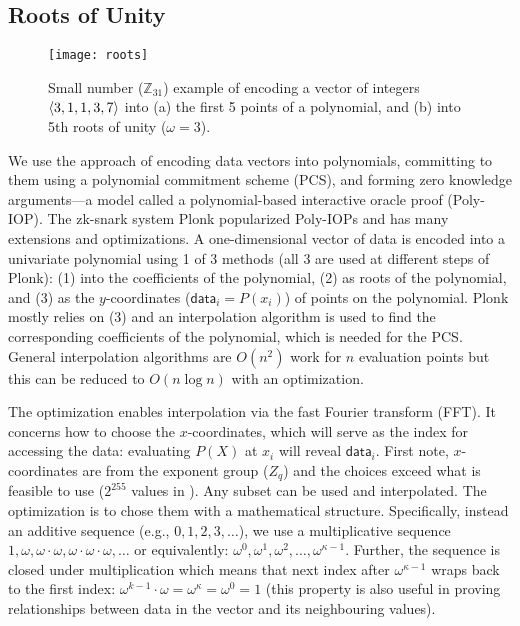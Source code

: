 \subsection{Roots of Unity}
\label{app:rou}

\begin{figure}
\centering
\texttt{[image: roots]}
\caption{Small number ($\mathbb{Z}_{31}$) example of encoding a vector of integers $\left \langle 3,1,1,3,7 \right \rangle$ into (a) the first 5 points of a polynomial, and (b) into 5th roots of unity ($\omega=3$).\label{fig:rou}}
\end{figure}

We use the approach of encoding data vectors into polynomials, committing to them using a polynomial commitment scheme (PCS), and forming zero knowledge arguments---a model called a polynomial-based interactive oracle proof (Poly-IOP). The zk-snark system Plonk popularized Poly-IOPs and has many extensions and optimizations. A one-dimensional vector of data is encoded into a univariate polynomial using 1 of 3 methods (all 3 are used at different steps of Plonk): (1) into the coefficients of the polynomial, (2) as roots of the polynomial, and (3) as the \(y\)-coordinates (\(\mathsf{data}_i=P(x_i)\)) of points on the polynomial. Plonk mostly relies on (3) and an interpolation algorithm is used to find the corresponding coefficients of the polynomial, which is
needed for the PCS. General interpolation algorithms are \(O(n^2)\) work for \(n\) evaluation points but this can be reduced to \(O(n\log n)\) with an optimization.

The optimization enables interpolation via the fast Fourier transform (FFT). It concerns how to choose the \(x\)-coordinates, which will serve as the index for accessing the data: evaluating \(P(X)\) at \(x_i\) will reveal \(\mathsf{data}_i\). First note, \(x\)-coordinates are from the exponent group (\(Z_q\)) and the choices exceed what is feasible to use (\(2^{255}\) values in \bls). Any subset can be used and interpolated. The optimization is to chose them with a mathematical structure. Specifically, instead an additive sequence (e.g., \(0,1,2,3,\ldots\)), we use a multiplicative sequence
\(1,\omega,\omega\cdot\omega,\omega\cdot\omega\cdot\omega,\ldots\) or equivalently: \(\omega^0,\omega^1,\omega^2,\ldots,\omega^{\kappa-1}\). Further, the sequence is closed under multiplication which means that next index after \(\omega^{\kappa-1}\) wraps back to the first index: \(\omega^{k-1} \cdot \omega = \omega^\kappa = \omega^0=1\) (this property is also useful in proving relationships between data in the vector and its neighbouring values).

